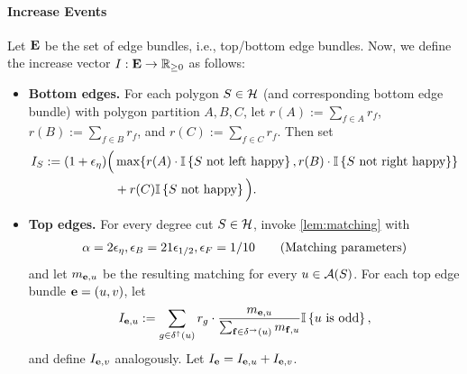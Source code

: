 \paragraph{Increase Events} 
Let ${\bf E}$ be the set of edge bundles, i.e., top/bottom edge bundles. 
Now, we define the increase vector $I: {\bf E} \to \mathbb{R}_{\geq 0}$ as follows:
\begin{itemize}
\item \textbf{Bottom edges.} For each polygon $S \in \mathcal{H}$ (and corresponding bottom edge bundle) with polygon partition $A,B,C$, let 
$r(A):= \sum_{f \in A} r_f$, $r(B):= \sum_{f \in B} r_f$, and  $r(C):= \sum_{f \in C} r_f$.
Then set
\begin{align}
I_S:= (1+{\epsilon}_\eta)
\Big(&
\max \{r(A)\cdot {\mathbb{I}}\left\{S \text{ not left happy}\right\}, r(B) \cdot{\mathbb{I}}\left\{S \text{ not right happy}\right\} \}\nonumber \\
&+ r(C) {\mathbb{I}}\left\{S\text{ not happy}\right\}\Big).
\label{eq:IeBottom}	
\end{align}
\item \textbf{Top edges.} 
For every degree cut $S \in \mathcal{H}$, invoke \cref{lem:matching} with \begin{align}\label{eq:matching-params} \alpha = 2{\epsilon}_\eta, {\epsilon}_B = 21{\epsilon}_{1/2}, {\epsilon}_F = 1/10\tag{Matching parameters}\end{align} and let $m_{{\bf e},u}$ be the resulting matching for every $u \in {\cal A}(S)$. For each  top edge bundle ${\bf e}= (u,v)$, let
\begin{equation}
\label{eq:Ieu}	
I_{{\bf e},u} := \sum_{g \in \delta^\uparrow(u)} r_g \cdot\frac{ m_{{\bf e},u}}{ \sum_{{\bf f}\in\delta^\rightarrow(u)} m_{{\bf f},u}}{\mathbb{I}}\left\{u \text{ is odd}\right\},\end{equation}
and define $I_{{\bf e},v}$ analogously. Let $I_{\bf e} = I_{{\bf e},u} + I_{{\bf e},v}$.
\end{itemize}

